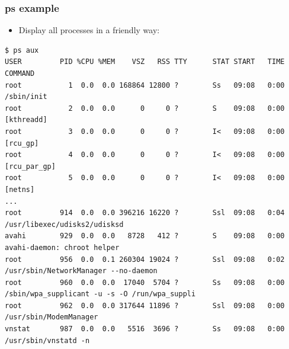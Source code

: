 \begin{frame}[fragile]
  \frametitle{ps example}
  \begin{itemize}
  \frametitle{Processes with {\em ps}}
    \item Display all processes in a friendly way:
  \end{itemize}
  \begin{block}{}
    \begin{verbatim}
$ ps aux
USER         PID %CPU %MEM    VSZ   RSS TTY      STAT START   TIME COMMAND
root           1  0.0  0.0 168864 12800 ?        Ss   09:08   0:00 /sbin/init
root           2  0.0  0.0      0     0 ?        S    09:08   0:00 [kthreadd]
root           3  0.0  0.0      0     0 ?        I<   09:08   0:00 [rcu_gp]
root           4  0.0  0.0      0     0 ?        I<   09:08   0:00 [rcu_par_gp]
root           5  0.0  0.0      0     0 ?        I<   09:08   0:00 [netns]
...
root         914  0.0  0.0 396216 16220 ?        Ssl  09:08   0:04 /usr/libexec/udisks2/udisksd
avahi        929  0.0  0.0   8728   412 ?        S    09:08   0:00 avahi-daemon: chroot helper
root         956  0.0  0.1 260304 19024 ?        Ssl  09:08   0:02 /usr/sbin/NetworkManager --no-daemon
root         960  0.0  0.0  17040  5704 ?        Ss   09:08   0:00 /sbin/wpa_supplicant -u -s -O /run/wpa_suppli
root         962  0.0  0.0 317644 11896 ?        Ssl  09:08   0:00 /usr/sbin/ModemManager
vnstat       987  0.0  0.0   5516  3696 ?        Ss   09:08   0:00 /usr/sbin/vnstatd -n
    \end{verbatim}
  \end{block}
\end{frame}


